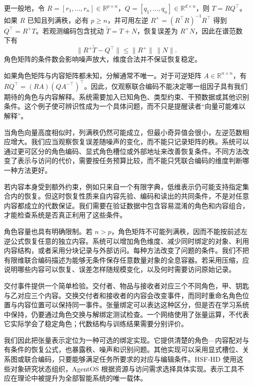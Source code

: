 更一般地，令 $R=[r_1,\ldots,r_n]\in\mathbb R^{p\times n}$，$Q=[q_1,\ldots,q_n]\in\mathbb R^{d\times n}$，则 $T=RQ^\top$。如果 $R$ 已知且列满秩，必有 $p\geq n$，并可用左逆 $R^+=(R^\top R)^{-1}R^\top$ 得到 $Q^\top=R^+T$。若观测编码包含扰动 $\widetilde T=T+N$，恢复误差为 $R^+N$，因此在谱范数下有
\begin{equation}
 \|R^+\widetilde T-Q^\top\|\leq\|R^+\|\,\|N\|.
\end{equation}
角色矩阵的条件数会影响噪声放大，维度合法并不保证恢复稳定。

如果角色矩阵与内容矩阵都未知，分解通常不唯一。对于可逆矩阵 $A\in\mathbb R^{n\times n}$，有 $RQ^\top=(RA)(QA^{-\top})^\top$。因此，仅观察联合编码不能决定哪一组因子具有我们期待的角色与内容解释。系统需要加入已知角色、类型约束、干预数据或其他识别条件。这个例子使可辨识性成为一个具体问题，而不只是提醒读者“向量可能难以解释”。

当角色向量高度相似时，列满秩仍然可能成立，但最小奇异值会很小，左逆范数相应增大。我们应当观察恢复误差随噪声的变化，而不能只记录矩阵的秩。系统可以通过更可区分的角色编码、显式角色槽位或外部地址来改善恢复条件。不同方法改变了表示与访问的代价，需要按任务预算比较，而不能只凭联合编码的维度判断哪一种方法更好。

若内容本身受到额外约束，例如只来自一个有限字典，低维表示仍可能支持指定集合内的恢复。但这时恢复性质来自内容先验、编码和读出的共同条件，不是对任意内容都成立的代数保证。我们需要在验证数据中包含容易混淆的角色和内容组合，才能检查系统是否真正利用了这些条件。

角色容量也具有明确限制。若 $n>p$，角色矩阵不可能列满秩，因而不能按前述左逆公式恢复任意的独立内容。系统可以增加角色维度、减少同时绑定的对象、利用内容结构，或者采用分块记录与外部访问。每种方法改变了问题的条件。我们不把有限维联合编码描述为能够无条件保存任意数量对象的全息容器。若采用压缩，应说明哪些内容可以恢复、误差怎样随规模变化，以及何时需要访问原始记录。

交付事件提供一个简单检验。交付者、物品与接收者对应三个不同角色，甲、钥匙与乙对应三个内容。交换交付者和接收者的内容会改变事件，而同时重命名角色位置与内容位置可以保持同一事件。张量绑定可以表达这种区分，但是否在学习系统中保持，仍要通过角色交换与解绑定测试检查。一个网络使用了张量运算，不代表它实际学会了稳定角色；代数结构与训练结果需要分别评价。

我们因此把张量表示定位为一种可选的绑定实现。它提供清楚的角色—内容配对与有条件的恢复公式，也暴露秩、噪声和识别问题。其他实现可以采用显式槽位、关系图或联合编码，只要能够满足任务所要求的对应与编辑条件。HSF-HD 使用这些对象研究状态组织，AgentOS 根据资源与访问需求选择具体实现。表示工具不应在理论中被提升为全部智能系统的唯一载体。


